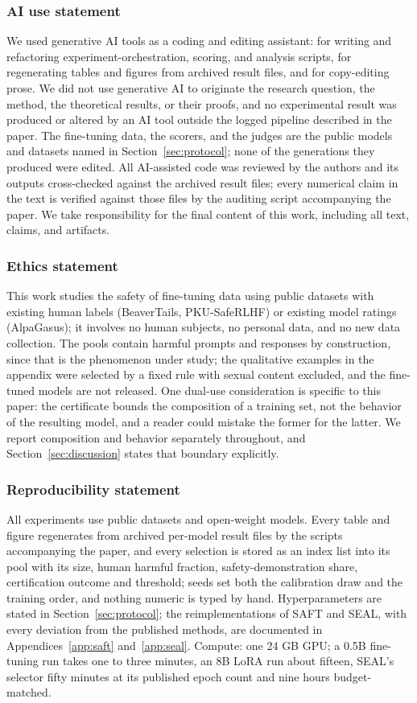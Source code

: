 \documentclass{article} %
\begin{document}
\subsubsection*{AI use statement}
We used generative AI tools as a coding and editing assistant: for writing and refactoring experiment-orchestration, scoring, and analysis scripts, for regenerating tables and figures from archived result files, and for copy-editing prose. We did not use generative AI to originate the research question, the method, the theoretical results, or their proofs, and no experimental result was produced or altered by an AI tool outside the logged pipeline described in the paper. The fine-tuning data, the scorers, and the judges are the public models and datasets named in Section~\ref{sec:protocol}; none of the generations they produced were edited. All AI-assisted code was reviewed by the authors and its outputs cross-checked against the archived result files; every numerical claim in the text is verified against those files by the auditing script accompanying the paper. We take responsibility for the final content of this work, including all text, claims, and artifacts.

\subsubsection*{Ethics statement}
This work studies the safety of fine-tuning data using public datasets with existing human labels (BeaverTails, PKU-SafeRLHF) or existing model ratings (AlpaGasus); it involves no human subjects, no personal data, and no new data collection. The pools contain harmful prompts and responses by construction, since that is the phenomenon under study; the qualitative examples in the appendix were selected by a fixed rule with sexual content excluded, and the fine-tuned models are not released. One dual-use consideration is specific to this paper: the certificate bounds the composition of a training set, not the behavior of the resulting model, and a reader could mistake the former for the latter. We report composition and behavior separately throughout, and Section~\ref{sec:discussion} states that boundary explicitly.

\subsubsection*{Reproducibility statement}
All experiments use public datasets and open-weight models. Every table and figure regenerates from archived per-model result files by the scripts accompanying the paper, and every selection is stored as an index list into its pool with its size, human harmful fraction, safety-demonstration share, certification outcome and threshold; seeds set both the calibration draw and the training order, and nothing numeric is typed by hand. Hyperparameters are stated in Section~\ref{sec:protocol}; the reimplementations of SAFT and SEAL, with every deviation from the published methods, are documented in Appendices~\ref{app:saft} and~\ref{app:seal}. Compute: one 24 GB GPU; a 0.5B fine-tuning run takes one to three minutes, an 8B LoRA run about fifteen, SEAL's selector fifty minutes at its published epoch count and nine hours budget-matched.
\end{document}

